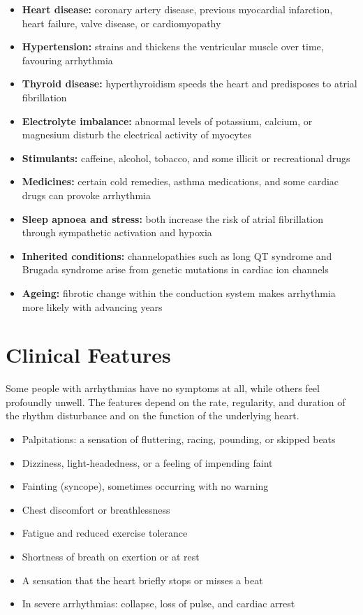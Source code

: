 \begin{itemize}
    \item \textbf{Heart disease:} coronary artery disease, previous myocardial infarction, heart failure, valve disease, or cardiomyopathy
    \item \textbf{Hypertension:} strains and thickens the ventricular muscle over time, favouring arrhythmia
    \item \textbf{Thyroid disease:} hyperthyroidism speeds the heart and predisposes to atrial fibrillation
    \item \textbf{Electrolyte imbalance:} abnormal levels of potassium, calcium, or magnesium disturb the electrical activity of myocytes
    \item \textbf{Stimulants:} caffeine, alcohol, tobacco, and some illicit or recreational drugs
    \item \textbf{Medicines:} certain cold remedies, asthma medications, and some cardiac drugs can provoke arrhythmia
    \item \textbf{Sleep apnoea and stress:} both increase the risk of atrial fibrillation through sympathetic activation and hypoxia
    \item \textbf{Inherited conditions:} channelopathies such as long QT syndrome and Brugada syndrome arise from genetic mutations in cardiac ion channels
    \item \textbf{Ageing:} fibrotic change within the conduction system makes arrhythmia more likely with advancing years
\end{itemize}

\section*{Clinical Features}
Some people with arrhythmias have no symptoms at all, while others feel profoundly unwell. The features depend on the rate, regularity, and duration of the rhythm disturbance and on the function of the underlying heart.

\begin{itemize}
    \item Palpitations: a sensation of fluttering, racing, pounding, or skipped beats
    \item Dizziness, light-headedness, or a feeling of impending faint
    \item Fainting (syncope), sometimes occurring with no warning
    \item Chest discomfort or breathlessness
    \item Fatigue and reduced exercise tolerance
    \item Shortness of breath on exertion or at rest
    \item A sensation that the heart briefly stops or misses a beat
    \item In severe arrhythmias: collapse, loss of pulse, and cardiac arrest
\end{itemize}

